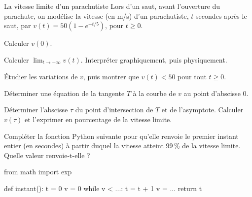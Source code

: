 \begin{exercice}[3]{La vitesse limite d'un parachutiste}
Lors d'un saut, avant l'ouverture du parachute, on modélise la vitesse (en m/s) d'un parachutiste,
$t$ secondes après le saut, par $v(t)=50\left(1-e^{-t/5}\right)$, pour $t\geq0$.
\begin{questions}
  \item Calculer $v(0)$.
  \item Calculer $\displaystyle\lim_{t\to+\infty}v(t)$. Interpréter graphiquement, puis physiquement.
  \item Étudier les variations de $v$, puis montrer que $v(t)<50$ pour tout $t\geq0$.
  \item \begin{questions}
      \item Déterminer une équation de la tangente $T$ à la courbe de $v$ au point d'abscisse $0$.
      \item Déterminer l'abscisse $\tau$ du point d'intersection de $T$ et de l'asymptote. Calculer $v(\tau)$ et
        l'exprimer en pourcentage de la vitesse limite.
    \end{questions}
  \item Compléter la fonction Python suivante pour qu'elle renvoie le premier instant entier (en secondes)
    à partir duquel la vitesse atteint 99\,\% de la vitesse limite. Quelle valeur renvoie-t-elle ?
\begin{python}
from math import exp

def instant():
    t = 0
    v = 0
    while v < ...:
        t = t + 1
        v = ...
    return t
\end{python}
\end{questions}
\end{exercice}
